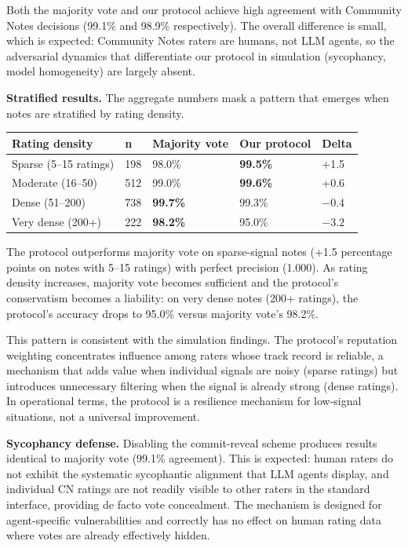 \documentclass[11pt]{article}
\begin{document}
Both the majority vote and our protocol achieve high agreement with Community Notes decisions (99.1\% and 98.9\% respectively). The overall difference is small, which is expected: Community Notes raters are humans, not LLM agents, so the adversarial dynamics that differentiate our protocol in simulation (sycophancy, model homogeneity) are largely absent.

\textbf{Stratified results.} The aggregate numbers mask a pattern that emerges when notes are stratified by rating density.

\begin{table}[h]
\centering
\small
\begin{tabular}{lllll}
\toprule
\textbf{Rating density} & \textbf{n} & \textbf{Majority vote} & \textbf{Our protocol} & \textbf{Delta} \\
\midrule
Sparse (5--15 ratings) & 198 & 98.0\% & \textbf{99.5\%} & +1.5 \\
Moderate (16--50) & 512 & 99.0\% & \textbf{99.6\%} & +0.6 \\
Dense (51--200) & 738 & \textbf{99.7\%} & 99.3\% & $-0.4$ \\
Very dense (200+) & 222 & \textbf{98.2\%} & 95.0\% & $-3.2$ \\
\bottomrule
\end{tabular}
\end{table}

The protocol outperforms majority vote on sparse-signal notes (+1.5 percentage points on notes with 5--15 ratings) with perfect precision (1.000). As rating density increases, majority vote becomes sufficient and the protocol's conservatism becomes a liability: on very dense notes (200+ ratings), the protocol's accuracy drops to 95.0\% versus majority vote's 98.2\%.

This pattern is consistent with the simulation findings. The protocol's reputation weighting concentrates influence among raters whose track record is reliable, a mechanism that adds value when individual signals are noisy (sparse ratings) but introduces unnecessary filtering when the signal is already strong (dense ratings). In operational terms, the protocol is a resilience mechanism for low-signal situations, not a universal improvement.

\textbf{Sycophancy defense.} Disabling the commit-reveal scheme produces results identical to majority vote (99.1\% agreement). This is expected: human raters do not exhibit the systematic sycophantic alignment that LLM agents display, and individual CN ratings are not readily visible to other raters in the standard interface, providing de facto vote concealment. The mechanism is designed for agent-specific vulnerabilities and correctly has no effect on human rating data where votes are already effectively hidden.
\end{document}
